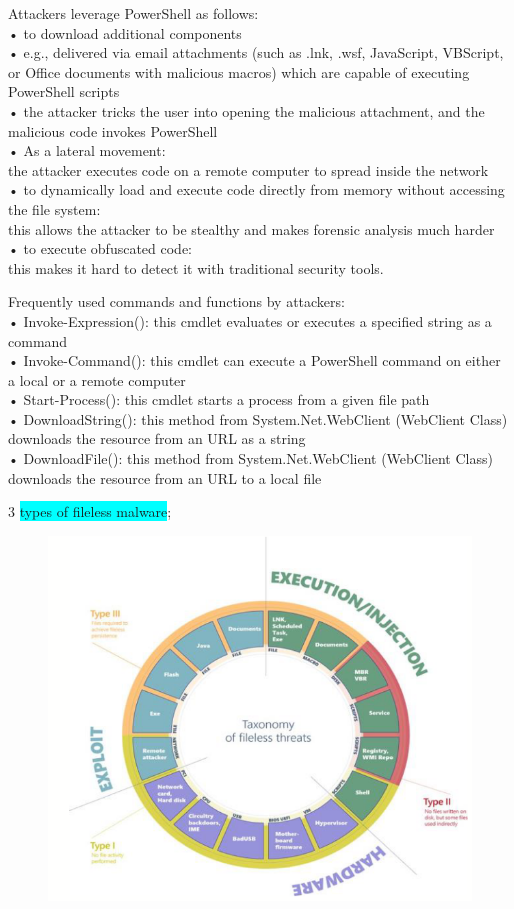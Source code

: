 \documentclass[]{project_plan}
\begin{document}
Attackers leverage PowerShell as follows:\\
• to download additional components\\
• e.g., delivered via email attachments (such as .lnk, .wsf, JavaScript, VBScript, or Office documents with
malicious macros) which are capable of executing PowerShell scripts\\
• the attacker tricks the user into opening the malicious attachment, and the malicious code invokes
PowerShell\\
• As a lateral movement:\\
the attacker executes code on a remote computer to spread inside the network\\
• to dynamically load and execute code directly from memory without accessing the file
system:\\
this allows the attacker to be stealthy and makes forensic analysis much harder\\
• to execute obfuscated code:\\
this makes it hard to detect it with traditional security tools.

Frequently used commands and functions by attackers:\\
• Invoke-Expression(): this cmdlet evaluates or executes a specified string as a
command\\
• Invoke-Command(): this cmdlet can execute a PowerShell command on either a local or a
remote computer\\
• Start-Process(): this cmdlet starts a process from a given file path\\
• DownloadString(): this method from System.Net.WebClient (WebClient Class)
downloads the resource from an URL as a string\\
• DownloadFile(): this method from System.Net.WebClient (WebClient Class)
downloads the resource from an URL to a local file

3 \colorbox{cyan}{types of fileless malware};
\begin{figure}[H]
  \centering
  \includegraphics[width=\linewidth]{toxonomy fileless threats.png}
\end{figure}
\end{document}
